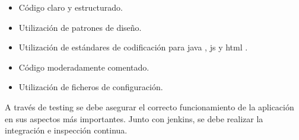 \begin{itemize}
	\item Código claro y estructurado.
    \item Utilización de patrones de diseño.
    \item Utilización de estándares de codificación para \gls{java} \cite{javacode}, \gls{js} \cite{javascriptcode} y \gls{html} \cite{htmlcode}.
    \item Código moderadamente comentado.
    \item Utilización de ficheros de configuración.
\end{itemize} 

A través de \gls{testing} se debe asegurar el correcto funcionamiento de la aplicación en sus aspectos más importantes. Junto con \gls{jenkins}, se debe realizar la integración e inspección continua.





